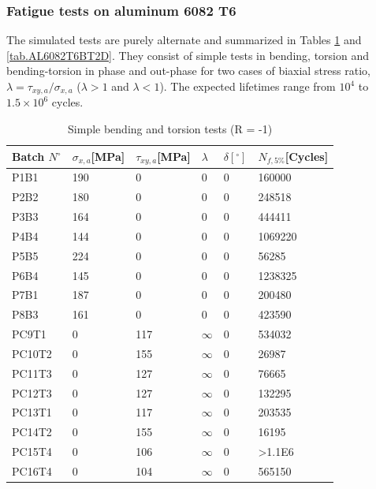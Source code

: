 \documentclass[3p,times,number,review]{elsarticle}
\begin{document}
\subsubsection{Fatigue tests on aluminum 6082 T6}
The simulated tests are purely alternate and summarized in Tables \ref{tab.AL6082T6BT1D} and \ref{tab.AL6082T6BT2D}. They consist of simple tests in bending, torsion and bending-torsion in phase and out-phase for two cases of biaxial stress ratio, $\lambda=\tau_{xy,a}/\sigma_{x,a}$
($\lambda>1$ and $\lambda<1$). The expected lifetimes range from $10^4$ to $1.5\times10^6$ cycles. 
\begin{table}[]
\centering
\begin{tabular}{|l|l|l|l|l|l|}
\hline
Batch $N^\circ$ & $\sigma_{x,a}${[}MPa{]} & $\tau_{xy,a}${[}MPa{]} & $\lambda$ & $\delta [^\circ]$ & $N_{f,5\%}${[}Cycles{]} \\ \hline
P1B1 & 190 & 0 & 0 & 0 & 160000 \\ \hline
P2B2 & 180 & 0 & 0 & 0 & 248518 \\ \hline
P3B3 & 164 & 0 & 0 & 0 & 444411 \\ \hline
P4B4 & 144 & 0 & 0 & 0 & 1069220 \\ \hline
P5B5 & 224 & 0 & 0 & 0 & 56285 \\ \hline
P6B4 & 145 & 0 & 0 & 0 & 1238325 \\ \hline
P7B1 & 187 & 0 & 0 & 0 & 200480 \\ \hline
P8B3 & 161 & 0 & 0 & 0 & 423590 \\ \hline
PC9T1 & 0 & 117 & $\infty$ & 0 & 534032 \\ \hline
PC10T2 & 0 & 155 & $\infty$ & 0 & 26987 \\ \hline
PC11T3 & 0 & 127 & $\infty$ & 0 & 76665 \\ \hline
PC12T3 & 0 & 127 & $\infty$ & 0 & 132295 \\ \hline
PC13T1 & 0 & 117 & $\infty$ & 0 & 203535 \\ \hline
PC14T2 & 0 & 155 & $\infty$ & 0 & 16195 \\ \hline
PC15T4 & 0 & 106 & $\infty$ & 0 & \textgreater1.1E6 \\ \hline
PC16T4 & 0 & 104 & $\infty$ & 0 & 565150 \\ \hline
\end{tabular}
\caption{Simple bending and torsion tests (R = -1)\cite{susmel2003multiaxial}}
\label{tab.AL6082T6BT1D}
\end{table}
\end{document}
